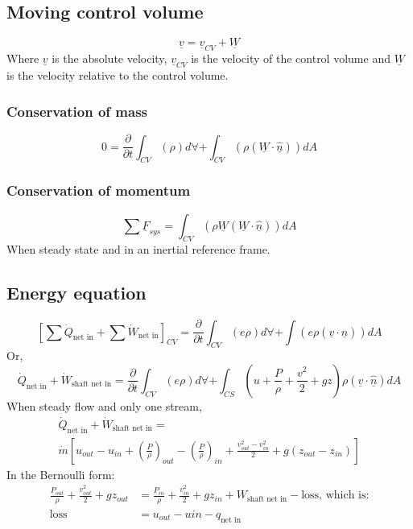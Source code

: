 \subsection{Moving control volume}
\[ \underline{v} = \underline{v}_{CV} + \underline{W} \]
Where \( \underline{v} \) is the absolute velocity, \( \underline{v}_{CV} \) is the velocity of the control volume and \( \underline{W} \) is the velocity relative to the control volume.
\subsubsection{Conservation of mass}
\[ 0 = \frac{\partial}{\partial t}\int_{CV} \left( \rho \right) d\forall + \int_{CV} \left( \rho (\underline{W} \cdot \underline{\hat{n}}) \right) dA \]
\subsubsection{Conservation of momentum}
\[ \sum \underline{F}_{sys} = \int_{CV} \left( \rho \underline{W} (\underline{W} \cdot \underline{\hat{n}}) \right) dA \]
When steady state and in an inertial reference frame.
\subsection{Energy equation}
\[ \left[ \sum \dot{Q}_{\textrm{net in}} + \sum \dot{W}_{\textrm{net in}} \right]_{CV} = \frac{\partial}{\partial t} \int_{CV} \left( e \rho \right) d \forall + \int \left( e \rho (\underline{v} \cdot \underline{\hat{n}}) \right) dA \]
Or,
\[ \dot{Q}_{\textrm{net in}} + \dot{W}_{\textrm{shaft net in}} =\frac{\partial}{\partial t} \int_{CV} \left( e \rho \right) d \forall + \int_{CS} \left( u + \frac{P}{\rho} + \frac{v^2}{2} + gz \right) \rho (\underline{v} \cdot \underline{\hat{n}}) dA \]
When steady flow and only one stream,
\begin{multline*}
  \dot{Q}_{\textrm{net in}} + \dot{W}_{\textrm{shaft net in}} =\\ \dot{m} \left[ u_{out} - u_{in} + \left( \frac{P}{\rho} \right)_{out} - \left( \frac{P}{\rho} \right)_{in} + \frac{v_{out}^2 - v_{in}^2}{2} + g(z_{out}- z_{in})  \right]
\end{multline*}
In the Bernoulli form:
\begin{align*}
  \frac{P_{out}}{\rho} + \frac{v_{out}^2}{2} + gz_{out} & = \frac{P_{in}}{\rho} + \frac{v_{in}^2}{2} + gz_{in} + W_{\textrm{shaft net in}} - \textrm{loss, which is:} \\
  \textrm{loss}                                         & = u_{out} - u{in} - q_{\textrm{net in}}
\end{align*}
